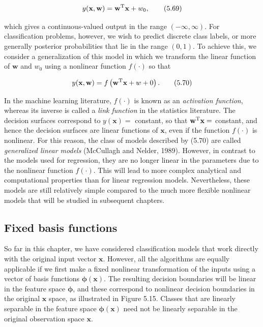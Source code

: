 \documentclass{article}
\begin{document}
\begin{equation}
y(\mathbf{x},\mathbf{w})=\mathbf{w}^{\rm T}\mathbf{x}+w_{0},
\tag{5.69}
\end{equation}

which gives a continuous-valued output in the range $(-\infty,\infty)$. For classification problems, however, we wish to predict discrete class labels, or more generally posterior probabilities that lie in the range $(0,1)$. To achieve this, we consider a generalization of this model in which we transform the linear function of $\mathbf{w}$ and $w_{0}$ using a nonlinear function $f(\cdot)$ so that

\begin{equation}
y(\mathbf{x},\mathbf{w})=f\left(\mathbf{w}^{\rm T}\mathbf{x}+w+0\right).
\tag{5.70}
\end{equation}

In the machine learning literature, $f(\cdot)$ is known as an \textit{activation function}, whereas its inverse is called a \textit{link function} in the statistics literature. The decision surfaces correspond to $y(\mathbf{x})=$ constant, so that $\mathbf{w}^{\rm T}\mathbf{x}=$ constant, and hence the decision surfaces are linear functions of $\mathbf{x}$, even if the function $f(\cdot)$ is nonlinear. For this reason, the class of models described by (5.70) are called \textit{generalized linear models} (McCullagh and Nelder, 1989). However, in contrast to the models used for regression, they are no longer linear in the parameters due to the nonlinear function $f(\cdot)$. This will lead to more complex analytical and computational properties than for linear regression models. Nevertheless, these models are still relatively simple compared to the much more flexible nonlinear models that will be studied in subsequent chapters.

\subsection{Fixed basis functions}

So far in this chapter, we have considered classification models that work directly with the original input vector $\mathbf{x}$. However, all the algorithms are equally applicable if we first make a fixed nonlinear transformation of the inputs using a vector of basis functions $\boldsymbol{\phi}(\mathbf{x})$. The resulting decision boundaries will be linear in the feature space $\boldsymbol{\phi}$, and these correspond to nonlinear decision boundaries in the original $\mathbf{x}$ space, as illustrated in Figure 5.15. Classes that are linearly separable in the feature space $\boldsymbol{\phi}(\mathbf{x})$ need not be linearly separable in the original observation space $\mathbf{x}$.
\end{document}
